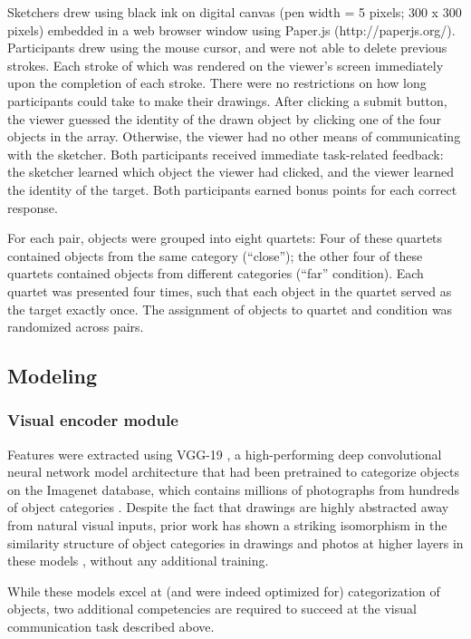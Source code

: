 \documentclass[9pt,twocolumn,twoside]{pnas-new}
\begin{document}
Sketchers drew using black ink on digital canvas (pen width = 5 pixels; 300 x 300 pixels) embedded in a web browser window using Paper.js (http://paperjs.org/). Participants drew using the mouse cursor, and were not able to delete previous strokes. Each stroke of which was rendered on the viewer's screen immediately upon the completion of each stroke. There were no restrictions on how long participants could take to make their drawings. After clicking a submit button, the viewer guessed the identity of the drawn object by clicking one of the four objects in the array. Otherwise, the viewer had no other means of communicating with the sketcher. Both participants received immediate task-related feedback: the sketcher learned which object the viewer had clicked, and the viewer learned the identity of the target. Both participants earned bonus points for each correct response. 

For each pair, objects were grouped into eight quartets: Four of these quartets contained objects from the same category (``close''); the other four of these quartets contained objects from different categories (``far'' condition). Each quartet was presented four times, such that each object in the quartet served as the target exactly once. The assignment of objects to quartet and condition was randomized across pairs. 

\subsection*{Modeling}

\subsubsection*{Visual encoder module}

Features were extracted using VGG-19 \cite{simonyan2014very}, a high-performing deep convolutional neural network model architecture that had been pretrained to categorize objects on the Imagenet database, which contains millions of photographs from hundreds of object categories \cite{deng2009imagenet}. Despite the fact that drawings are highly abstracted away from natural visual inputs, prior work has shown a striking isomorphism in the similarity structure \cite{kriegeskorte2008matching} of object categories in drawings and photos at higher layers in these models \cite[]{fan2015common}, without any additional training.

While these models excel at (and were indeed optimized for) categorization of objects, two additional competencies are required to succeed at the visual communication task described above.
\end{document}
